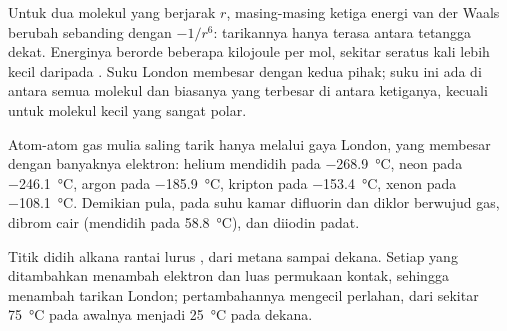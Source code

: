 \begin{proposition}\label{prop:b1:intermolecular-forces-solvents:distance-law}
Untuk dua molekul yang berjarak $r$, masing-masing ketiga energi van der
Waals berubah sebanding dengan $-1/r^6$: tarikannya hanya terasa antara
tetangga dekat. Energinya berorde beberapa kilojoule per mol, sekitar
seratus kali lebih kecil daripada . Suku London membesar
dengan  kedua pihak; suku ini ada di antara semua molekul
dan biasanya yang terbesar di antara ketiganya, kecuali untuk molekul
kecil yang sangat polar.
\end{proposition}
\admitted

\begin{example}\label{ex:b1:intermolecular-forces-solvents:noble}
Atom-atom gas mulia saling tarik hanya melalui gaya London, yang membesar
dengan banyaknya elektron: helium mendidih pada \qty{-268.9}{\celsius},
neon pada \qty{-246.1}{\celsius}, argon pada \qty{-185.9}{\celsius},
kripton pada \qty{-153.4}{\celsius}, xenon pada \qty{-108.1}{\celsius}.
Demikian pula, pada suhu kamar difluorin dan diklor berwujud gas, dibrom
cair (mendidih pada \qty{58.8}{\celsius}), dan diiodin padat.
\end{example}

\begin{omfigure}

{\small Titik didih alkana rantai lurus , dari metana
sampai dekana. Setiap  yang ditambahkan menambah elektron dan
luas permukaan kontak, sehingga menambah tarikan London; pertambahannya
mengecil perlahan, dari sekitar \qty{75}{\celsius} pada awalnya menjadi
\qty{25}{\celsius} pada dekana.}
\end{omfigure}

